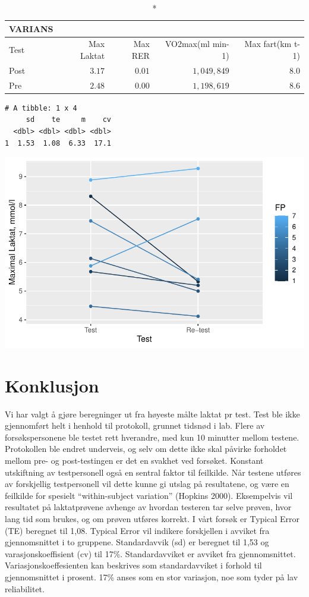 \documentclass[
  letterpaper,
  DIV=11,
  numbers=noendperiod]{scrreprt}
\begin{document}
\begin{longtable}{lrrrr}
\caption*{
{\large VARIANS}
} \\ 
\toprule
Test & Max Laktat & Max RER & VO2max(ml min-1) & Max fart(km t-1) \\ 
\midrule
Post & $3.17$ & $0.01$ & $1,049,849$ & $8.0$ \\ 
Pre & $2.48$ & $0.00$ & $1,198,619$ & $8.6$ \\ 
\bottomrule
\end{longtable}

\begin{verbatim}
# A tibble: 1 x 4
     sd    te     m    cv
  <dbl> <dbl> <dbl> <dbl>
1  1.53  1.08  6.33  17.1
\end{verbatim}

\includegraphics{./part1_files/figure-pdf/unnamed-chunk-8-1.pdf}


\hypertarget{konklusjon}{%
\chapter{Konklusjon}\label{konklusjon}}

Vi har valgt å gjøre beregninger ut fra høyeste målte laktat pr test.
Test ble ikke gjennomført helt i henhold til protokoll, grunnet tidsnød
i lab. Flere av forsøkspersonene ble testet rett hverandre, med kun 10
minutter mellom testene. Protokollen ble endret underveis, og selv om
dette ikke skal påvirke forholdet mellom pre- og post-testingen er det
en svakhet ved forsøket. Konstant utskiftning av testpersonell også en
sentral faktor til feilkilde. Når testene utføres av forskjellig
testpersonell vil dette kunne gi utslag på resultatene, og være en
feilkilde for spesielt ``within-subject variation'' (Hopkins 2000).
Eksempelvis vil resultatet på laktatprøvene avhenge av hvordan testeren
tar selve prøven, hvor lang tid som brukes, og om prøven utføres
korrekt. I vårt forsøk er Typical Error (TE) beregnet til 1,08. Typical
Error vil indikere forskjellen i avviket fra gjennomsnittet i to
gruppene. Standardavvik (sd) er beregnet til 1,53 og
varasjonskoeffisient (cv) til 17\%. Standardavviket er avviket fra
gjennomsnittet. Variasjonskoeffesienten kan beskrives som
standardavviket i forhold til gjennomsnittet i prosent. 17\% anses som
en stor variasjon, noe som tyder på lav reliabilitet.
\end{document}
